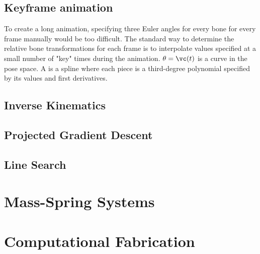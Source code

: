 \documentclass[11pt]{article}
\numberwithin{equation}{section}
\begin{document}
\subsection{Keyframe animation}
To create a long animation, specifying three Euler angles for every bone for every frame manually would be too difficult. The standard way to determine the relative bone transformations for each frame is to interpolate values specified at a small number of "key" times during the animation. 
 $\theta = \vc(t)$ is a curve in the pose space. A  is a spline where each piece is a third-degree polynomial specified by its values and first derivatives.
 \subsection{Inverse Kinematics}
 \subsection{Projected Gradient Descent}
 \subsection{Line Search}

\section{Mass-Spring Systems}



\section{Computational Fabrication}
\end{document}
